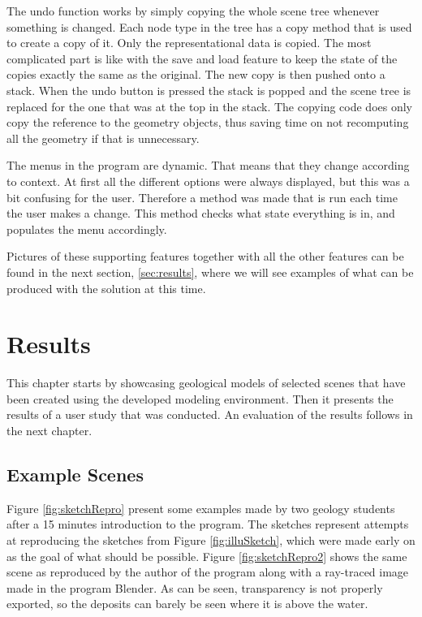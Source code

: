 \documentclass[a4paper,12pt]{report}
\newcommand{\secref}[1]{\autoref{#1}}
\begin{document}
The undo function works by simply copying the whole scene tree whenever something is changed. Each node type in the tree has a copy method that is used to create a copy of it. Only the representational data is copied. The most complicated part is like with the save and load feature to keep the state of the copies exactly the same as the original. The new copy is then pushed onto a stack. When the undo button is pressed the stack is popped and the scene tree is replaced for the one that was at the top in the stack. The copying code does only copy the reference to the geometry objects, thus saving time on not recomputing all the geometry if that is unnecessary.

The menus in the program are dynamic. That means that they change according to context. At first all the different options were always displayed, but this was a bit confusing for the user. Therefore a method was made that is run each time the user makes a change. This method checks what state everything is in, and populates the menu accordingly.

Pictures of these supporting features together with all the other features can be found in the next section, \secref{sec:results}, where we will see examples of what can be produced with the solution at this time.

\clearpage
\chapter{Results}
This chapter starts by showcasing geological models of selected scenes that have been created using the developed modeling environment. Then it presents the results of a user study that was conducted. An evaluation of the results follows in the next chapter. 
\label{sec:results}

\section{Example Scenes}
Figure \ref{fig:sketchRepro} present some examples made by two geology students after a 15 minutes introduction to the program. The sketches represent attempts at reproducing the sketches from Figure \ref{fig:illuSketch}, which were made early on as the goal of what should be possible. Figure \ref{fig:sketchRepro2} shows the same scene as reproduced by the author of the program along with a ray-traced image made in the program Blender. As can be seen, transparency is not properly exported, so the deposits can barely be seen where it is above the water.
\end{document}
